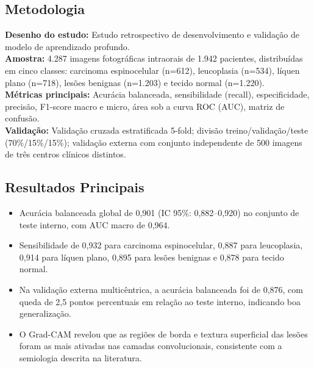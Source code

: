 \subsection{Metodologia}
\textbf{Desenho do estudo:} Estudo retrospectivo de desenvolvimento e validação
de modelo de aprendizado profundo. \\
\textbf{Amostra:} 4.287 imagens fotográficas intraorais de 1.942 pacientes,
distribuídas em cinco classes: carcinoma espinocelular (n=612), leucoplasia
(n=534), líquen plano (n=718), lesões benignas (n=1.203) e tecido normal
(n=1.220). \\
\textbf{Métricas principais:} Acurácia balanceada, sensibilidade (recall),
especificidade, precisão, F1-score macro e micro, área sob a curva ROC (AUC),
matriz de confusão. \\
\textbf{Validação:} Validação cruzada estratificada 5-fold; divisão
treino/validação/teste (70\%/15\%/15\%); validação externa com conjunto
independente de 500 imagens de três centros clínicos distintos.

\subsection{Resultados Principais}
\begin{itemize}
  \item Acurácia balanceada global de 0,901 (IC 95\%: 0,882--0,920) no
        conjunto de teste interno, com AUC macro de 0,964.
  \item Sensibilidade de 0,932 para carcinoma espinocelular, 0,887 para
        leucoplasia, 0,914 para líquen plano, 0,895 para lesões benignas
        e 0,878 para tecido normal.
  \item Na validação externa multicêntrica, a acurácia balanceada foi de
        0,876, com queda de 2,5 pontos percentuais em relação ao teste
        interno, indicando boa generalização.
  \item O Grad-CAM revelou que as regiões de borda e textura superficial
        das lesões foram as mais ativadas nas camadas convolucionais,
        consistente com a semiologia descrita na literatura.
\end{itemize}

